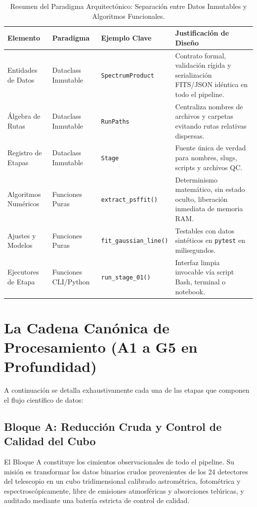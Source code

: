 \documentclass[11pt,a4paper]{article}
\begin{document}
\begin{table}[h!]
\centering
\small
\begin{tabularx}{\textwidth}{@{}llp{3.5cm}X@{}}
\toprule
\textbf{Elemento} & \textbf{Paradigma} & \textbf{Ejemplo Clave} & \textbf{Justificación de Diseño} \\
\midrule
Entidades de Datos & Dataclass Inmutable & \texttt{SpectrumProduct} & Contrato formal, validación rígida y serialización FITS/JSON idéntica en todo el pipeline. \\
Álgebra de Rutas & Dataclass Inmutable & \texttt{RunPaths} & Centraliza nombres de archivos y carpetas evitando rutas relativas dispersas. \\
Registro de Etapas & Dataclass Inmutable & \texttt{Stage} & Fuente única de verdad para nombres, slugs, scripts y archivos QC. \\
Algoritmos Numéricos & Funciones Puras & \texttt{extract\_psffit()} & Determinismo matemático, sin estado oculto, liberación inmediata de memoria RAM. \\
Ajustes y Modelos & Funciones Puras & \texttt{fit\_gaussian\_line()} & Testables con datos sintéticos en \texttt{pytest} en milisegundos. \\
Ejecutores de Etapa & Funciones CLI/Python & \texttt{run\_stage\_01()} & Interfaz limpia invocable vía script Bash, terminal o notebook. \\
\bottomrule
\end{tabularx}
\caption{Resumen del Paradigma Arquitectónico: Separación entre Datos Inmutables y Algoritmos Funcionales.}
\end{table}

\section{La Cadena Canónica de Procesamiento (A1 a G5 en Profundidad)}

A continuación se detalla exhaustivamente cada una de las etapas que componen el flujo científico de datos:

\subsection{Bloque A: Reducción Cruda y Control de Calidad del Cubo}

El Bloque A constituye los cimientos observacionales de todo el pipeline. Su misión es transformar los datos binarios crudos provenientes de los 24 detectores del telescopio en un cubo tridimensional calibrado astrométrica, fotométrica y espectroscópicamente, libre de emisiones atmosféricas y absorciones telúricas, y auditado mediante una batería estricta de control de calidad.
\end{document}
